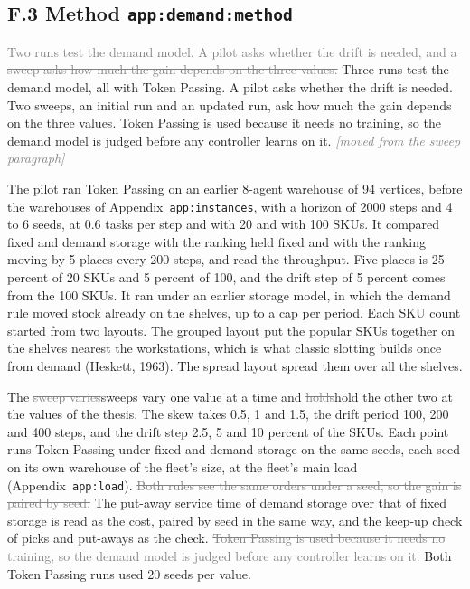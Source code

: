 \documentclass[11pt,a4paper]{article}
\newcommand{\new}[1]{\textcolor{newc}{#1}}
\newcommand{\old}[1]{\textcolor{gray}{\sout{#1}}}
\newcommand{\lref}[1]{{\small\texttt{#1}}}
\newcommand{\moved}[1]{{\small\textcolor{gray}{\emph{[moved from #1]}}}}
\begin{document}
\subsection*{F.3 Method \hfill\lref{app:demand:method}}

\old{Two runs test the demand model. A pilot asks whether the drift is
needed, and a sweep asks how much the gain depends on the three values.}
\new{Three runs test the demand model, all with Token Passing. A pilot asks
whether the drift is needed. Two sweeps, an initial run and an updated run,
ask how much the gain depends on the three values.}
Token Passing is used because it needs no training, so the demand model is
judged before any controller learns on it. \moved{the sweep paragraph}

The pilot ran Token Passing on an earlier 8-agent warehouse of 94 vertices,
before the warehouses of Appendix~\lref{app:instances}, with a horizon of 2000
steps and 4 to 6 seeds\new{, at 0.6 tasks per step and with 20 and with 100
SKUs}. It compared fixed and demand storage with the ranking held fixed and
with the ranking moving \new{by 5 places} every 200 steps, and read the
throughput. \new{Five places is 25 percent of 20 SKUs and 5 percent of 100,
and the drift step of 5 percent comes from the 100 SKUs.} It ran under an
earlier storage model, in which the demand rule moved stock already on the
shelves, up to a cap per period.
\new{Each SKU count started from two layouts. The grouped layout put the
popular SKUs together on the shelves nearest the workstations, which is what
classic slotting builds once from demand (Heskett, 1963). The spread layout
spread them over all the shelves.}

The \old{sweep varies}\new{sweeps vary} one value at a time and \old{holds}\new{hold} the other two at the values of
the thesis. The skew takes 0.5, 1 and 1.5, the drift period 100, 200 and 400
steps, and the drift step 2.5, 5 and 10 percent of the SKUs. Each point runs
Token Passing under fixed and demand storage on the same seeds, each seed on
its own warehouse of the fleet's size, at the fleet's main load
(Appendix~\lref{app:load}). \old{Both rules see the same orders under a seed,
so the gain is paired by seed.} The put-away service time of demand storage
over that of fixed storage is read as the cost\new{, paired by seed in the
same way}, and the keep-up check of picks and put-aways as the check.
\old{Token Passing is used because it needs no training, so the demand model
is judged before any controller learns on it.} Both Token Passing runs used
20 seeds per value.
\end{document}
